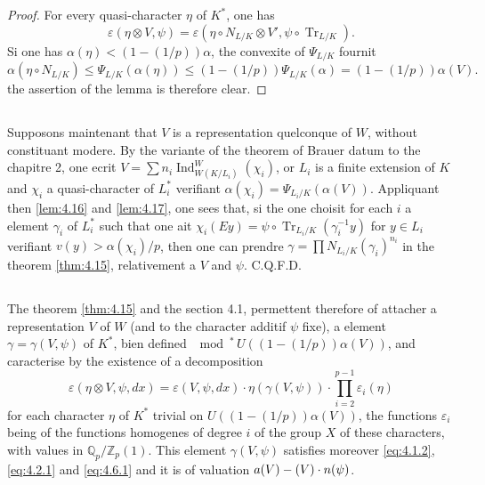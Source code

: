\documentclass[12pt,a4paper]{article}
\theoremstyle{plain}
\theoremstyle{definition}
\theoremstyle{remark}
\DeclareMathOperator{\Ind}{Ind}
\DeclareMathOperator{\Tr}{Tr}
\newcommand{\bQ}{\mathbb{Q}}
\newcommand{\bZ}{\mathbb{Z}}
\let\dim\relax\let\det\relax
\providecommand{\Tr}{\operatorname{Tr}}
\begin{document}
\begin{proof}
For every quasi-character $\eta$ of $K^*$, one has
\[
\varepsilon(\eta \otimes V, \psi) = \varepsilon(\eta \circ N_{L/K} \otimes V', \psi \circ \Tr_{L/K}).
\]
Si one has $\alpha(\eta) < (1-(1/p))\alpha$, the convexite of $\Psi_{L/K}$ fournit
\[
\alpha(\eta \circ N_{L/K}) \leq \Psi_{L/K}(\alpha(\eta)) \leq (1-(1/p)) \Psi_{L/K}(\alpha) = (1-(1/p)) \alpha(V).
\]
the assertion of the lemma is therefore clear.
\end{proof}

\subsection{}
\label{sec:4.18}

Supposons maintenant that $V$ is a representation quelconque of $W$, without constituant modere. By the variante of the theorem of Brauer datum to the chapitre 2, one ecrit $V = \sum n_i \Ind_{W(K/L_i)}^W(\chi_i)$, or $L_i$ is a finite extension of $K$ and $\chi_i$ a quasi-character of $L_i^*$ verifiant $\alpha(\chi_i) = \Psi_{L_i/K}(\alpha(V))$. Appliquant then \ref{lem:4.16} and \ref{lem:4.17}, one sees that, si the one choisit for each $i$ a element $\gamma_i$ of $L_i^*$ such that one ait $\chi_i(Ey) = \psi \circ \Tr_{L_i/K}(\gamma_i^{-1} y)$ for $y \in L_i$ verifiant $v(y) > \alpha(\chi_i)/p$, then one can prendre $\gamma = \prod N_{L_i/K}(\gamma_i)^{n_i}$ in the theorem \ref{thm:4.15}, relativement a $V$ and $\psi$. C.Q.F.D.

\subsection{}
\label{sec:4.19}

The theorem \ref{thm:4.15} and the section 4.1, permettent therefore of attacher a representation $V$ of $W$ (and to the character additif $\psi$ fixe), a element $\gamma = \gamma(V, \psi)$ of $K^*$, bien defined $\mod^*\, U((1-(1/p))\alpha(V))$, and caracterise by the existence of a decomposition
\begin{equation}\label{eq:4.19.1}
\varepsilon(\eta \otimes V, \psi, dx) = \varepsilon(V, \psi, dx) \cdot \eta(\gamma(V, \psi)) \cdot \prod_{i=2}^{p-1} \varepsilon_i(\eta)
\end{equation}
for each character $\eta$ of $K^*$ trivial on $U((1-(1/p))\alpha(V))$, the functions $\varepsilon_i$ being of the functions homogenes of degree $i$ of the group $X$ of these characters, with values in $\bQ_p/\bZ_p(1)$. This element $\gamma(V, \psi)$ satisfies moreover \eqref{eq:4.1.2}, \eqref{eq:4.2.1} and \eqref{eq:4.6.1} and it is of valuation $a(V) - (\dim V) \cdot n(\psi)$.
\end{document}

